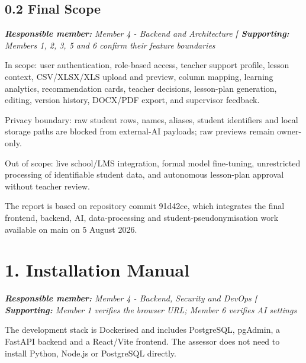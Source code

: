 \documentclass[11pt,a4paper]{article}
\begin{document}
\subsection*{0.2 Final Scope}


\noindent\textit{\textbf{Responsible member: }Member 4 - Backend and Architecture\textbf{ | Supporting: }Members 1, 2, 3, 5 and 6 confirm their feature boundaries}\par

In scope: user authentication, role-based access, teacher support profile, lesson context, CSV/XLSX/XLS upload and preview, column mapping, learning analytics, recommendation cards, teacher decisions, lesson-plan generation, editing, version history, DOCX/PDF export, and supervisor feedback.\par

Privacy boundary: raw student rows, names, aliases, student identifiers and local storage paths are blocked from external-AI payloads; raw previews remain owner-only.\par

Out of scope: live school/LMS integration, formal model fine-tuning, unrestricted processing of identifiable student data, and autonomous lesson-plan approval without teacher review.\par

The report is based on repository commit 91d42ce, which integrates the final frontend, backend, AI, data-processing and student-pseudonymisation work available on main on 5 August 2026.\par

\section*{1. Installation Manual}


\noindent\textit{\textbf{Responsible member: }Member 4 - Backend, Security and DevOps\textbf{ | Supporting: }Member 1 verifies the browser URL; Member 6 verifies AI settings}\par

The development stack is Dockerised and includes PostgreSQL, pgAdmin, a FastAPI backend and a React/Vite frontend. The assessor does not need to install Python, Node.js or PostgreSQL directly.\par
\end{document}
